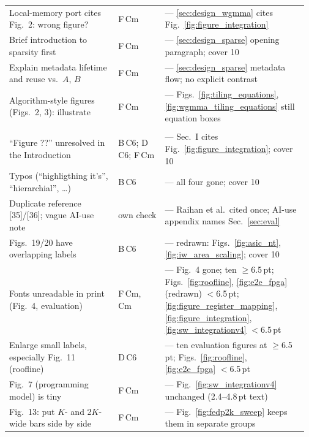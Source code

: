 \begin{longtable}{@{}p{0.355\linewidth} p{0.155\linewidth} p{0.46\linewidth}@{}}
Local-memory port cites Fig.~2: wrong figure? & F\,Cm & \stR{} --- \ref{sec:design_wgmma} cites Fig.~\ref{fig:figure_integration} \\
Brief introduction to sparsity first & F\,Cm & \stR{} --- \ref{sec:design_sparse} opening paragraph; cover 10 \\
Explain metadata lifetime and reuse vs.\ $A$, $B$ & F\,Cm & \stP{} --- \ref{sec:design_sparse} metadata flow; no explicit contrast \\
Algorithm-style figures (Figs.~2, 3): illustrate & F\,Cm & \stO{} --- Figs.~\ref{fig:tiling_equations}, \ref{fig:wgmma_tiling_equations} still equation boxes \\
\rowcolor{gray!18}\multicolumn{3}{@{}l@{}}{\textbf{Figures, fonts and typos}} \\
``Figure ??'' unresolved in the Introduction & B\,C6; D\,C6; F\,Cm & \stR{} --- Sec.~I cites Fig.~\ref{fig:figure_integration}; cover 10 \\
Typos (``highligthing it's'', ``hierarchial'', \ldots) & B\,C6 & \stR{} --- all four gone; cover 10 \\
Duplicate reference [35]/[36]; vague AI-use note & own check & \stR{} --- Raihan et al.\ cited once; AI-use appendix names Sec.~\ref{sec:eval} \\
Figs.~19/20 have overlapping labels & B\,C6 & \stR{} --- redrawn: Figs.~\ref{fig:asic_nt}, \ref{fig:iw_area_scaling}; cover 10 \\
Fonts unreadable in print (Fig.~4, evaluation) & F\,Cm, Cm & \stP{} --- Fig.~4 gone; ten $\geq$6.5\,pt; Figs.~\ref{fig:roofline}, \ref{fig:e2e_fpga} (redrawn) $<$6.5\,pt; \ref{fig:figure_register_mapping}, \ref{fig:figure_integration}, \ref{fig:sw_integrationv4} $<$6.5\,pt \\
Enlarge small labels, especially Fig.~11 (roofline) & D\,C6 & \stP{} --- ten evaluation figures at $\geq$6.5\,pt; Figs.~\ref{fig:roofline}, \ref{fig:e2e_fpga} $<$6.5\,pt \\
Fig.~7 (programming model) is tiny & F\,Cm & \stO{} --- Fig.~\ref{fig:sw_integrationv4} unchanged (2.4--4.8\,pt text) \\
Fig.~13: put $K$- and 2$K$-wide bars side by side & F\,Cm & \stO{} --- Fig.~\ref{fig:fedp2k_sweep} keeps them in separate groups \\
\bottomrule
\end{longtable}
\endgroup
\setcounter{table}{\value{trkTable}}
\clearpage
\twocolumn
